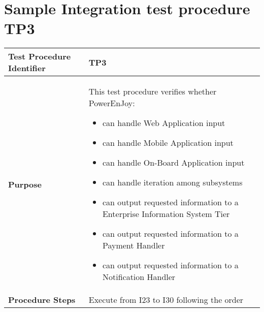 \section{Sample Integration test procedure TP3} \label{TP3}
\begin{center}
	\vspace{0.6cm}
	\begin{tabular}{|l|p{9cm}|}
		\hline
		\textbf{Test Procedure Identifier} & TP3 \bigstrut \\\hline
		\textbf{Purpose} 
		& This test procedure verifies whether PowerEnJoy: 
		\begin{itemize} 
			\item can handle Web Application input
			\item can handle Mobile Application input
			\item can handle On-Board Application input
			\item can handle iteration among subsystems 
			\item can output requested information to a Enterprise Information System Tier
			\item can output requested information to a Payment Handler
			\item can output requested information to a Notification Handler
		\end{itemize} \bigstrut \\\hline
		\textbf{Procedure Steps} & Execute from I23 to I30 following the order \bigstrut \\\hline
	\end{tabular}
\end{center}